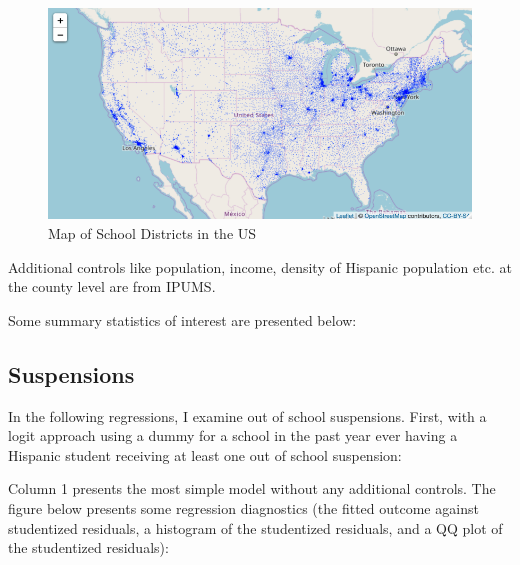 \documentclass{article}
\begin{document}
\begin{figure}[!hbtp]
\centering
\caption{Map of School Districts in the US}
\includegraphics[width=12cm]{../analysis/Output/img/LEAMap.png}
\end{figure} 

Additional controls like population, income, density of Hispanic population etc. at the county level are from IPUMS.

Some summary statistics of interest are presented below:

\clearpage


\clearpage

\subsection*{Suspensions}

In the following regressions, I examine out of school suspensions. First, with a logit approach using a dummy for a school in the past year ever having a Hispanic student receiving at least one out of school suspension: 


\clearpage

Column 1 presents the most simple model without any additional controls. The figure below presents some regression diagnostics (the fitted outcome against studentized residuals, a histogram of the studentized residuals, and a QQ plot of the studentized residuals): 
\end{document}
